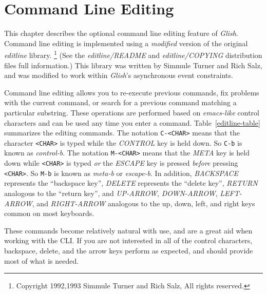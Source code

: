 
\chapter{Command Line Editing}
\label{cli-editing}

This chapter describes the optional command line editing feature
of {\em Glish}. Command line editing is implemented using a {\em modified}
version of the original {\em editline} library.
\footnote{Copyright 1992,1993 Simmule Turner and Rich Salz, All rights reserved.}
(See the {\em editline/README} and {\em editline/COPYING}
distribution files full information.) This library was written
by Simmule Turner and Rich Salz, and was modified to work within 
{\em Glish}'s asynchronous event constraints.

Command line editing allows you to re-execute previous commands, fix
problems with the current command, or search for a 
previous command matching
a particular substring. These operations are performed based on 
{\em emacs-like} control characters and can be used any time you
enter a command. Table~\ref{editline-table} summarizes
the editing commands. The notation {\tt C-\verb-<CHAR>-} means that the character 
{\tt \verb-<CHAR>-} is typed while the {\em CONTROL} key is held down. So
{\tt C-b} is known as {\em control-b}. The notation {\tt M-\verb-<CHAR>-} 
means that the {\em META} key is held down while {\tt \verb-<CHAR>-} is typed {\em or}
the {\em ESCAPE} key is pressed {\em before} pressing {\tt \verb-<CHAR>-}. So
{\tt M-b} is known as {\em meta-b} or {\em escape-b}. In addition, {\em BACKSPACE}
represents the ``backspace key'', {\em DELETE} represents  the ``delete key'',
{\em RETURN} analogous to the ``return key'', and {\em UP-ARROW}, {\em DOWN-ARROW},
{\em LEFT-ARROW}, and {\em RIGHT-ARROW} analogous to the up, down, left, and right
keys common on most keyboards.

These commands become relatively natural with use, and are a great aid
when working with the CLI. If you are not interested in all of the
control characters, backspace, delete, and the arrow keys perform as expected,
and should provide most of what is  needed.

